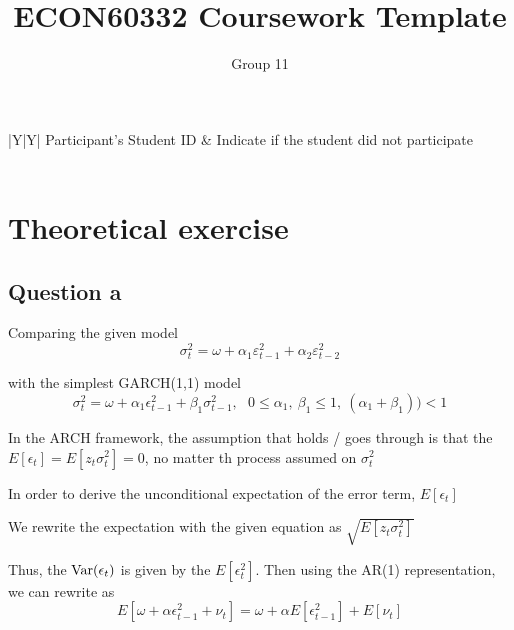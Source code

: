 \documentclass{article}
\title{ECON60332 Coursework Template}
\author{Group 11} %
\date{}
\begin{document}
\maketitle

\noindent\begin{tabularx}{\linewidth}{|Y|Y|}
    \hline
     Participant’s Student ID & Indicate if the student did not participate \\
    \hline
    \\
    \hline

\end{tabularx}

\section*{Theoretical exercise}

\subsection*{Question a}

Comparing the given model 
\begin{equation}
\sigma_t^2=\omega+\alpha_1 \varepsilon_{t-1}^2+\alpha_2 \varepsilon_{t-2}^2
\end{equation}

with the simplest GARCH(1,1) model 
 \begin{equation}
 \sigma^2_{t} = \omega + \alpha_1 \epsilon^2_{t-1} + \beta_1 \sigma^2_{t-1} , \ \ \ 0 \le \alpha_1, \ \beta_1 \le 1 , \ \left( \alpha_1 + \beta_1 \right) ) < 1
 \end{equation} 

In the ARCH framework, the assumption that holds / goes through is that the $E \left[ \epsilon_t \right] = E \left[ z_{t} \sigma^2_{t} \right]= 0 $, no matter th process assumed on $\sigma^2_{t}$

In order to derive  the unconditional expectation of the error term, $E \left[ \epsilon_t \right]$

We rewrite the expectation with the given equation as $\sqrt{E \left[ z_{t} \sigma^2_{t} \right]}$

Thus, the $\textnormal{Var}(\epsilon_t)$ is given by the $E \left[ \epsilon_t^2 \right]$. 
Then using the AR(1) representation, we can rewrite as 
  \[
	  E \left[ \omega + \alpha \epsilon_{t-1}^2 + \nu_t  \right] = \omega + \alpha E \left[ \epsilon^2_{t-1} \right] + E \left[ \nu_t  \right]
 \] 
\end{document}
